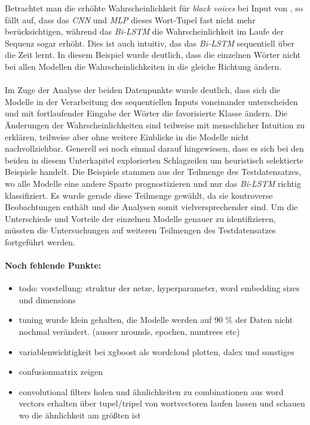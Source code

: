 \documentclass[a4paper,11pt]{article}
\begin{document}
Betrachtet man die erhöhte Wahrscheinlichkeit für \textit{black voices} bei Input von , so fällt auf, dass das \textit{CNN} und \textit{MLP} dieses Wort-Tupel fast nicht mehr berücksichtigen, während das \textit{Bi-LSTM} die Wahrscheinlichkeit im Laufe der Sequenz sogar erhöht. Dies ist auch intuitiv, das das \textit{Bi-LSTM} sequentiell über die Zeit lernt. In diesem Beispiel wurde deutlich, dass die einzelnen Wörter nicht bei allen Modellen die Wahrscheinlichkeiten in die gleiche Richtung ändern.\\
\\
Im Zuge der Analyse der beiden Datenpunkte wurde deutlich, dass sich die Modelle in der Verarbeitung des sequentiellen Inputs voneinander unterscheiden und mit fortlaufender Eingabe der Wörter die favorisierte Klasse ändern. Die Änderungen der Wahrscheinlichkeiten sind teilweise mit menschlicher Intuition zu erklären, teilweise aber ohne weitere Einblicke in die Modelle nicht nachvollziehbar. Generell sei noch einmal darauf hingewiesen, dass es sich bei den beiden in diesem Unterkapitel explorierten Schlagzeilen um heuristisch selektierte Beispiele handelt. Die Beispiele stammen aus der Teilmenge des Testdatensatzes, wo alle Modelle eine andere Sparte prognostizieren und nur das \textit{Bi-LSTM} richtig klassifiziert. Es wurde gerade diese Teilmenge gewählt, da sie kontroverse Beobachtungen enthält und die Analysen somit vielversprechender sind. Um die Unterschiede und Vorteile der einzelnen Modelle genauer zu identifizieren, müssten die Untersuchungen auf weiteren  Teilmengen des Testdatensatzes fortgeführt werden.



\paragraph{Noch fehlende Punkte:}

\begin{itemize}
    \item todo: vorstellung: struktur der netze, hyperparameter, word embedding sizes und dimensions
    \item tuning wurde klein gehalten, die Modelle werden auf 90 \% der Daten nicht nochmal verändert. (ausser nrounds, epochen, numtrees etc)
\end{itemize}{}



\begin{itemize}
    \item variablenwichtigkeit bei xgboost als wordcloud plotten, dalex und sonstiges
    \item confusionmatrix zeigen
    \item convolutional filters holen und ähnlichkeiten zu combinationen aus word vectors erhalten über tupel/tripel von wortvectoren laufen lassen und schauen wo die ähnlichkeit am größten ist
\end{itemize}{}
\end{document}
